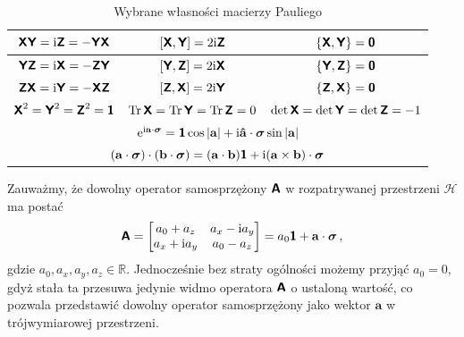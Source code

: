 \documentclass{myclass}
\begin{document}
\renewcommand{\arraystretch}{2}
\begin{table}[ht]
    \centering
    \begin{tabular}{|ccc|}
    \hline
    \multicolumn{1}{|c|}{\(\boldsymbol{\mathsf{XY}} = \mathrm{i}\boldsymbol{\mathsf{Z}} = -\boldsymbol{\mathsf{YX}}\)}            &
    \multicolumn{1}{c|}{\([\boldsymbol{\mathsf{X}},\boldsymbol{\mathsf{Y}}] = 2\mathrm{i}\boldsymbol{\mathsf{Z}}\)}          & \(\{\boldsymbol{\mathsf{X}}, \boldsymbol{\mathsf{Y}}\}
    = \boldsymbol{\mathsf{\mathsf{0}}}\)      \\ \hline
    \multicolumn{1}{|c|}{\(\boldsymbol{\mathsf{YZ}} = \mathrm{i}\boldsymbol{\mathsf{X}} = -\boldsymbol{\mathsf{ZY}}\)}            &
    \multicolumn{1}{c|}{\([\boldsymbol{\mathsf{Y}},\boldsymbol{\mathsf{Z}}] = 2\mathrm{i}\boldsymbol{\mathsf{X}}\)}          & \(\{\boldsymbol{\mathsf{Y}}, \boldsymbol{\mathsf{Z}}\}
    = \boldsymbol{\mathsf{\mathsf{0}}}\)      \\ \hline
    \multicolumn{1}{|c|}{\(\boldsymbol{\mathsf{ZX}} = \mathrm{i}\boldsymbol{\mathsf{Y}} = -\boldsymbol{\mathsf{XZ}}\)}            &
    \multicolumn{1}{c|}{\([\boldsymbol{\mathsf{Z}},\boldsymbol{\mathsf{X}}] = 2\mathrm{i}\boldsymbol{\mathsf{Y}}\)}          & \(\{\boldsymbol{\mathsf{Z}}, \boldsymbol{\mathsf{X}}\}
    = \boldsymbol{\mathsf{\mathsf{0}}}\)      \\ \hline
    \multicolumn{1}{|c|}{\(\boldsymbol{\mathsf{X}}^2 = \boldsymbol{\mathsf{Y}}^2 = \boldsymbol{\mathsf{Z}}^2 = \boldsymbol{\mathsf{1}}\)} &
    \multicolumn{1}{c|}{\(\Tr\boldsymbol{\mathsf{X}} = \Tr\boldsymbol{\mathsf{Y}} = \Tr\boldsymbol{\mathsf{Z}} = 0\)} & \(\det\boldsymbol{\mathsf{X}} =
    \det\boldsymbol{\mathsf{Y}} = \det\boldsymbol{\mathsf{Z}} = -1\) \\ \hline
    \multicolumn{3}{|c|}{\(\mathrm{e}^{\mathrm{i}\mathbf{a}\cdot\boldsymbol{\mathsf{\sigma}}} = \boldsymbol{\mathsf{1}}\cos|\mathbf{a}| + \mathrm{i}
    \mathbf{\hat{a}}\cdot\boldsymbol{\mathsf{\sigma}}\sin|\mathbf{a}|\)} \\ \hline
    \multicolumn{3}{|c|}{\((\mathbf{a}\cdot\boldsymbol{\mathsf{\sigma}})\cdot(\mathbf{b}\cdot\boldsymbol{\mathsf{\sigma}}) =
    (\mathbf{a}\cdot\mathbf{b})\boldsymbol{\mathsf{1}} + \mathrm{i}(\mathbf{a}\times\mathbf{b})\cdot\boldsymbol{\mathsf{\sigma}}\)} \\
    \hline
    \end{tabular}
    \caption{Wybrane własności macierzy Pauliego}
\end{table}
\renewcommand{\arraystretch}{1}

Zauważmy, że dowolny operator samosprzężony \(\boldsymbol{\mathsf{A}}\) w rozpatrywanej przestrzeni \(\mathscr{H}\)
ma postać
\begin{equation*}
    \oper{A} = \mqty[a_0 + a_z & a_x - \im a_y \\ a_x + \im a_y & a_0 - a_z] = a_0\oper{1} + \mathbf{a}\cdot\boldsymbol{\sigma}\,, 
\end{equation*}
gdzie \(a_0,a_x,a_y,a_z \in \mathbb{R}\). Jednocześnie bez straty ogólności możemy przyjąć \(a_0 =
0\), gdyż stała ta przesuwa jedynie widmo operatora \(\boldsymbol{\mathsf{A}}\) o ustaloną wartość, co pozwala
przedstawić dowolny operator samosprzężony jako wektor \(\mathbf{a}\) w trójwymiarowej przestrzeni.
\end{document}
